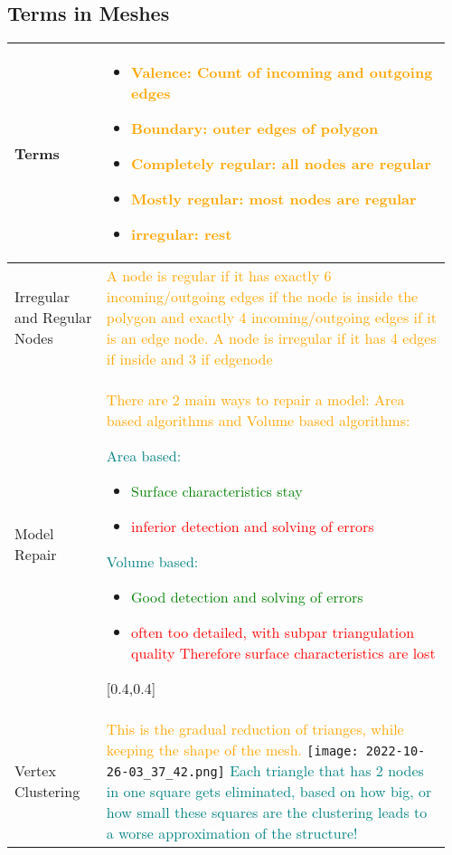 \documentclass[main.tex,fontsize=8pt,paper=a4,paper=portrait,DIV=calc,]{scrartcl}
\begin{document}
\begin{table}[ht!]
\subsection{Terms in Meshes}
\begin{tabular}{|m{0.2\linewidth}|m{0.755\linewidth}|}
\hline
Terms &
\begin{itemize}
\item \textcolor{orange}{Valence: Count of incoming and outgoing edges}
\item \textcolor{orange}{Boundary: outer edges of polygon}
\item \textcolor{orange}{Completely regular: all nodes are regular}
\item \textcolor{orange}{Mostly regular: most nodes are regular}
\item \textcolor{orange}{irregular: rest}
\vspace{-3mm}
\end{itemize}\\
\hline 
Irregular and Regular Nodes & 
\textcolor{orange}{A node is regular if it has exactly 6 incoming/outgoing edges if the node is inside the polygon and exactly 4 incoming/outgoing edges if it is an edge node.}\newline
\textcolor{orange}{A node is irregular if it has 4 edges if inside and 3 if edgenode}\\
\hline
Model Repair & 
\textcolor{orange}{There are 2 main ways to repair a model: Area based algorithms and Volume based algorithms:}\newline
\minipg{
\textcolor{teal}{Area based:}\newline
\begin{itemize}
  \item \textcolor{green}{ Surface characteristics stay} 
  \item \textcolor{red}{ inferior detection and solving of errors } 
    \, \newline
    \, \newline
\end{itemize}
}{
\textcolor{teal}{Volume based:}\newline
\begin{itemize}
  \item \textcolor{green}{ Good detection and solving of errors} 
  \item \textcolor{red}{ often too detailed, with subpar triangulation quality\newline
    Therefore surface characteristics are lost} 
\end{itemize}
}[0.4,0.4]\\
\hline
Vertex Clustering & 
\textcolor{orange}{This is the gradual reduction of trianges, while keeping the shape of the mesh.}\newline
\texttt{[image: 2022-10-26-03\_37\_42.png]}\newline
\textcolor{teal}{Each triangle that has 2 nodes in one square gets eliminated, based on how big, or how small these squares are the clustering leads to a worse approximation of the structure!}\\
\hline
\end{tabular}
\end{table}
\end{document}
